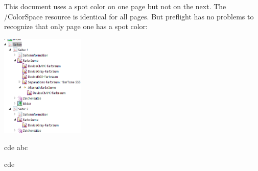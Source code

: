 \documentclass[12pt]{scrartcl}
\begin{document}
This document uses a spot color on one page but not on the next.
The /ColorSpace resource is identical for all pages. But preflight 
has no problems to recognize that only page one has a spot color:

\includegraphics[width=4cm]{preflight-colorspace}


cde \textcolor{foo}{abc}

\newpage

cde
\end{document}
